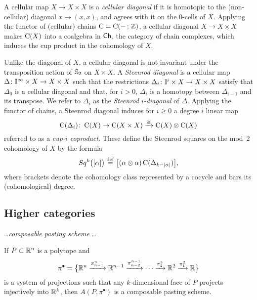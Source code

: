 A cellular map $X \to X \times X$ is a \textit{cellular diagonal} if it is homotopic to the (non-cellular) diagonal $x \mapsto (x, x)$, and agrees with it on the $0$-cells of $X$.
Applying the functor of (cellular) chains $\operatorname{C} = \operatorname{C}(-\, ;\, \mathbb{Z})$, a cellular diagonal $X \to X \times X$ makes $\operatorname{C}(X)$ into a coalgebra in $\mathsf{Ch}$, the category of chain complexes, which induces the cup product in the cohomology of $X$.

Unlike the diagonal of $X$, a cellular diagonal is not invariant under the transposition action of $\mathbb{S}_2$ on $X \times X$.
A \textit{Steenrod diagonal} is a cellular map $\Delta \colon \mathbb{I}^\infty \times X \to X \times X$ such that the restrictions $\Delta_i \colon \mathbb{I}^i \times X \to X \times X$ satisfy that $\Delta_0$ is a cellular diagonal and that, for $i > 0$, $\Delta_i$ is a homotopy between $\Delta_{i-1}$ and its transpose.
We refer to $\Delta_i$ as the \textit{Steenrod $i$-diagonal} of $\Delta$.
Applying the functor of chains, a Steenrod diagonal induces for $i \geq 0$ a degree $i$ linear map
\[
\operatorname{C}(\Delta_i) \colon \operatorname{C}(X) \to \operatorname{C}(X \times X) \xrightarrow{\cong} \operatorname{C}(X) \otimes \operatorname{C}(X)
\]
referred to as a \textit{cup-$i$ coproduct}.
These define the Steenrod squares on the mod~$2$ cohomology of $X$ by the formula
\[
Sq^k\big( [\alpha] \big) \stackrel{\mathrm{def}}{=} \big[ (\alpha \otimes \alpha)\operatorname{C}(\Delta_{k-\lvert\alpha\rvert}) \big],
\]
where brackets denote the cohomology class represented by a cocycle and bars its (cohomological) degree.

\subsection{Higher categories}

\dots \textit{composable pasting scheme} \dots

\begin{proposition}
	If $P \subset \mathbb{R}^n$ is a polytope and
	\[
	\pi^\bullet = \big\{
	\mathbb{R}^n \xrightarrow{\pi^n_{n-1}} \mathbb{R}^{n-1} \xrightarrow{\pi^{n-1}_{n-2}} \dotsb \xrightarrow{\pi^3_{2}} \mathbb{R}^2 \xrightarrow{\pi^2_1} \mathbb{R}
	\big\}
	\]
	is a system of projections such that any $k$-dimensional
	face of $P$ projects injectively into $\mathbb{R}^k$, then $A(P, \pi^\bullet)$ is a composable pasting scheme.
\end{proposition}